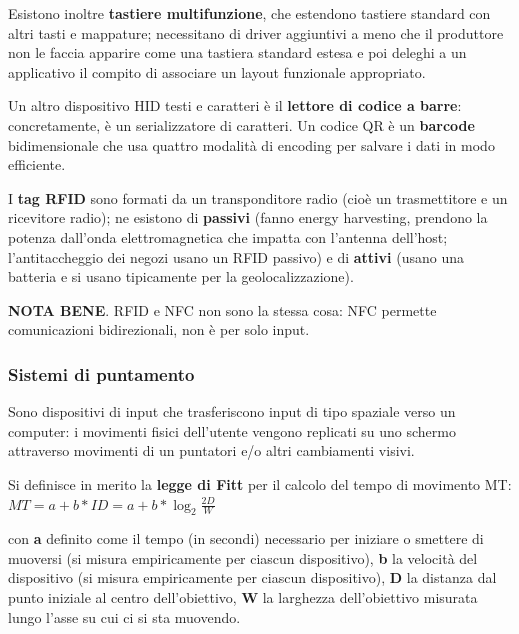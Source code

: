 Esistono inoltre \textbf{tastiere multifunzione}, che estendono tastiere standard con altri tasti e mappature; necessitano di driver aggiuntivi a meno
che il produttore non le faccia apparire come una tastiera standard estesa e poi deleghi a un applicativo il compito di associare un layout funzionale
appropriato.

Un altro dispositivo HID testi e caratteri è il \textbf{lettore di codice a barre}: concretamente, è un serializzatore di caratteri. Un codice QR è un
\textbf{barcode} bidimensionale che usa quattro modalità di encoding per salvare i dati in modo efficiente.

I \textbf{tag RFID} sono formati da un transponditore radio (cioè un trasmettitore e un ricevitore radio); ne esistono di \textbf{passivi} (fanno
energy harvesting, prendono la potenza dall'onda elettromagnetica che impatta con l'antenna dell'host; l'antitaccheggio dei negozi usano un RFID passivo)
e di \textbf{attivi} (usano una batteria e si usano tipicamente per la geolocalizzazione).

\textbf{NOTA BENE}. RFID e NFC non sono la stessa cosa: NFC permette comunicazioni bidirezionali, non è per solo input.

\subsubsection*{Sistemi di puntamento}
Sono dispositivi di input che trasferiscono input di tipo spaziale verso un computer: i movimenti fisici dell'utente vengono replicati su uno schermo
attraverso movimenti di un puntatori e/o altri cambiamenti visivi.

Si definisce in merito la \textbf{legge di Fitt} per il calcolo del tempo di movimento MT: \( MT = a + b * ID = a + b * \log_2 \frac{2D}{W} \)

con \textbf{a} definito come il tempo (in secondi) necessario per iniziare o smettere di muoversi (si misura empiricamente per ciascun dispositivo),
\textbf{b} la velocit\`a del dispositivo (si misura empiricamente per ciascun dispositivo),
\textbf{D} la distanza dal punto iniziale al centro dell'obiettivo,
\textbf{W} la larghezza dell'obiettivo misurata lungo l'asse su cui ci si sta muovendo.

